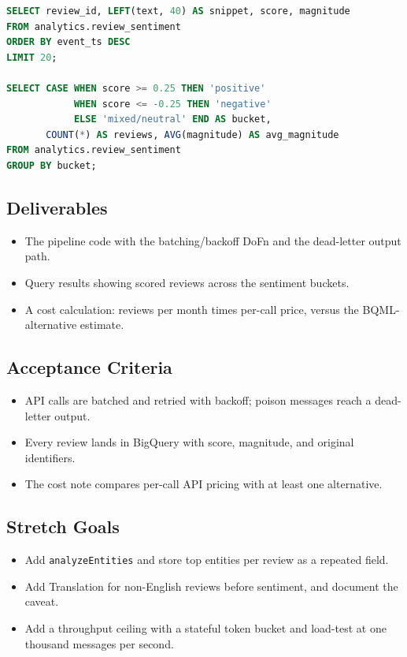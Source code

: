 \begin{lstlisting}[language=SQL,caption={Inspecting scored reviews and sentiment distribution.}]
SELECT review_id, LEFT(text, 40) AS snippet, score, magnitude
FROM analytics.review_sentiment
ORDER BY event_ts DESC
LIMIT 20;

SELECT CASE WHEN score >= 0.25 THEN 'positive'
            WHEN score <= -0.25 THEN 'negative'
            ELSE 'mixed/neutral' END AS bucket,
       COUNT(*) AS reviews, AVG(magnitude) AS avg_magnitude
FROM analytics.review_sentiment
GROUP BY bucket;
\end{lstlisting}

\subsection*{Deliverables}
\begin{itemize}
    \item The pipeline code with the batching/backoff DoFn and the dead-letter output path.
    \item Query results showing scored reviews across the sentiment buckets.
    \item A cost calculation: reviews per month times per-call price, versus the BQML-alternative estimate.
\end{itemize}

\subsection*{Acceptance Criteria}
\begin{itemize}
    \item API calls are batched and retried with backoff; poison messages reach a dead-letter output.
    \item Every review lands in BigQuery with score, magnitude, and original identifiers.
    \item The cost note compares per-call API pricing with at least one alternative.
\end{itemize}

\subsection*{Stretch Goals}
\begin{itemize}
    \item Add \texttt{analyzeEntities} and store top entities per review as a repeated field.
    \item Add Translation for non-English reviews before sentiment, and document the caveat.
    \item Add a throughput ceiling with a stateful token bucket and load-test at one thousand messages per second.
\end{itemize}


